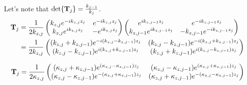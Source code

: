 Let's note that $\det{\vb{T}_j} = \frac{k_{j-1}}{k_{j}}$.
\begin{align*}
	\vb{T}_j &=
	\frac{1}{2k_{z,j}}\pmqty{
		k_{z,j} e^{-ik_{z,j}z_j} & 
		e^{-ik_{z,j}z_j}  \\
		k_{z,j} e^{ik_{z,j}z_j} & 
		-e^{ik_{z,j}z_j}
		} \pmqty{
	e^{ik_{z,j-1}z_j} & 
	e^{-ik_{z,j-1}z_j}  \\
	k_{z,j-1} e^{ik_{z,j-1}z_j} & 
	-k_{z,j-1} e^{-ik_{z,j-1}z_j}
	}  \\
	&= \frac{1}{2k_{z,j}}\pmqty{
		\pqty{k_{z,j} + k_{z,j-1}}e^{-i\pqty{k_{z,j} - k_{z,j-1}}z_j} &
		\pqty{k_{z,j} - k_{z,j-1}}e^{-i\pqty{k_{z,j} + k_{z,j-1}}z_j}  \\
		\pqty{k_{z,j} - k_{z,j-1}}e^{ i\pqty{k_{z,j} + k_{z,j-1}}z_j} &
		\pqty{k_{z,j} + k_{z,j-1}}e^{ i\pqty{k_{z,j} - k_{z,j-1}}z_j}
		} \\
\end{align*}

\begin{align*}
	\vb{T}_j &=
		\frac{1}{2\kappa_{z,j}}\pmqty{
		\pqty{\kappa_{z,j} + \kappa_{z,j-1}}e^{\pqty{\kappa_{z,j} - \kappa_{z,j-1}}z_j} &
		\pqty{\kappa_{z,j} - \kappa_{z,j-1}}e^{\pqty{\kappa_{z,j} + \kappa_{z,j-1}}z_j}  \\
		\pqty{\kappa_{z,j} - \kappa_{z,j-1}}e^{ -\pqty{\kappa_{z,j} + \kappa_{z,j-1}}z_j} &
		\pqty{\kappa_{z,j} + \kappa_{z,j-1}}e^{ -\pqty{\kappa_{z,j} - \kappa_{z,j-1}}z_j}
		} \\
\end{align*}



